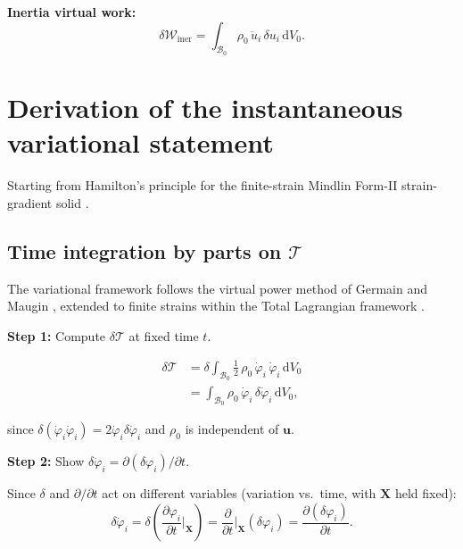 \documentclass[11pt]{article}
\newcommand{\bX}{\mathbf{X}}
\newcommand{\bu}{\mathbf{u}}
\newcommand{\bX}{\mathbf{X}}
\newcommand{\bu}{\mathbf{u}}
\begin{document}
\textbf{Inertia virtual work:}
\begin{equation}
\delta\mathcal{W}_{\mathrm{iner}}
= \int_{\mathcal{B}_{0}} \rho_{0}\,\ddot{u}_{i}\,\delta u_{i}\,
  \mathrm{d}V_{0}.
\end{equation}

\section{Derivation of the instantaneous variational statement}

Starting from Hamilton's principle \cite{Hamilton1834,Goldstein2002} for the finite-strain Mindlin Form-II strain-gradient solid \cite{Gurtin1981,MarsdenHughes1983}.

\subsection{Time integration by parts on $\mathcal{T}$}

The variational framework follows the virtual power method of Germain \cite{Germain1973} and Maugin \cite{Maugin1980}, extended to finite strains within the Total Lagrangian framework \cite{Holzapfel2000,BonetWood2008,SimoHughes1998,Bathe2006}.

\textbf{Step 1:} Compute $\delta\mathcal{T}$ at fixed time $t$.

\begin{align}
\delta\mathcal{T}
&= \delta\int_{\mathcal{B}_{0}}
   \tfrac12\,\rho_{0}\,\dot{\varphi}_{i}\,\dot{\varphi}_{i}\,
   \mathrm{d}V_{0}
\nonumber\\
&= \int_{\mathcal{B}_{0}}
   \rho_{0}\,\dot{\varphi}_{i}\,\delta\dot{\varphi}_{i}\,
   \mathrm{d}V_{0},
\end{align}

since $\delta(\dot{\varphi}_{i}\dot{\varphi}_{i})
= 2\dot{\varphi}_{i}\delta\dot{\varphi}_{i}$ and $\rho_{0}$ is
independent of $\bu$.

\textbf{Step 2:} Show $\delta\dot{\varphi}_{i}
= \partial(\delta\varphi_{i})/\partial t$.

Since $\delta$ and $\partial/\partial t$ act on different variables
(variation vs.\ time, with $\bX$ held fixed):
\begin{equation}
\delta\dot{\varphi}_{i}
= \delta\!\left(\frac{\partial\varphi_{i}}{\partial t}\bigg|_{\bX}\right)
= \frac{\partial}{\partial t}\bigg|_{\bX}(\delta\varphi_{i})
= \frac{\partial(\delta\varphi_{i})}{\partial t}.
\end{equation}
\end{document}
